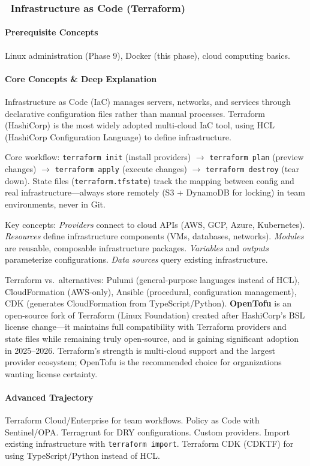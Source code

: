 \documentclass[11pt, a4paper, oneside]{report}
\newcommand{\mustmaster}[1]{\subsubsection{\texorpdfstring{\fcolorbox{blue!40!black}{blue!8}{\footnotesize\bfseries\color{blue!40!black} MUST MASTER}~#1}{#1}}}
\newcommand{\arrow}{$\rightarrow$}
\begin{document}
\mustmaster{Infrastructure as Code (Terraform)}

\paragraph{Prerequisite Concepts} Linux administration (Phase 9), Docker (this phase), cloud computing basics.

\paragraph{Core Concepts \& Deep Explanation} Infrastructure as Code (IaC) manages servers, networks, and services through declarative configuration files rather than manual processes. Terraform (HashiCorp) is the most widely adopted multi-cloud IaC tool, using HCL (HashiCorp Configuration Language) to define infrastructure.

Core workflow: \texttt{terraform init} (install providers) \arrow{} \texttt{terraform plan} (preview changes) \arrow{} \texttt{terraform apply} (execute changes) \arrow{} \texttt{terraform destroy} (tear down). State files (\texttt{terraform.tfstate}) track the mapping between config and real infrastructure---always store remotely (S3 + DynamoDB for locking) in team environments, never in Git.

Key concepts: \emph{Providers} connect to cloud APIs (AWS, GCP, Azure, Kubernetes). \emph{Resources} define infrastructure components (VMs, databases, networks). \emph{Modules} are reusable, composable infrastructure packages. \emph{Variables} and \emph{outputs} parameterize configurations. \emph{Data sources} query existing infrastructure.

Terraform vs.\ alternatives: Pulumi (general-purpose languages instead of HCL), CloudFormation (AWS-only), Ansible (procedural, configuration management), CDK (generates CloudFormation from TypeScript/Python). \textbf{OpenTofu} is an open-source fork of Terraform (Linux Foundation) created after HashiCorp's BSL license change---it maintains full compatibility with Terraform providers and state files while remaining truly open-source, and is gaining significant adoption in 2025--2026. Terraform's strength is multi-cloud support and the largest provider ecosystem; OpenTofu is the recommended choice for organizations wanting license certainty.

\paragraph{Advanced Trajectory} Terraform Cloud/Enterprise for team workflows. Policy as Code with Sentinel/OPA. Terragrunt for DRY configurations. Custom providers. Import existing infrastructure with \texttt{terraform import}. Terraform CDK (CDKTF) for using TypeScript/Python instead of HCL.
\end{document}
